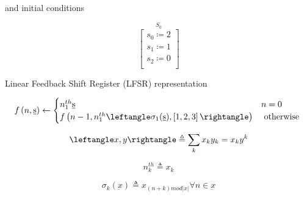 and initial conditions

\begin{equation}
\stackrel{\mbox{$S_0$}}{
\left[ \begin{array}{c}
s_0 \coloneqq 2 \\
s_1 \coloneqq 1 \\
s_2 \coloneqq 0 \\
\end{array} \right]
}
\label{eq:direct_init}
\end{equation}

Linear Feedback Shift Register (LFSR) representation
\newline

\begin{equation}
f\left(n,\underbar{s}\right)
\leftarrow
\begin{cases}
n^{th}_1 \underbar{s} & n = 0 \\
f\left( n-1, n^{th}_1 \leftangle \sigma_{1}(\underbar{s}), \left[ 1,2,3 \right] \rightangle \right) & \mbox{ otherwise }
\end{cases}
\label{eq:lfsr_def}
\end{equation}

\begin{equation}
\leftangle x, y \rightangle
\triangleq
\sum_{k} x_k y_k 
= x_k y^k
\label{eq:dotprod}
\end{equation}

\begin{equation}
n^{th}_k
\triangleq
x_k
\label{eq:nth}
\end{equation}

\begin{equation}
\sigma_k \left( \underbar{x} \right)
\triangleq
x_{\left( n + k \right) mod |x|} \forall n \in \underbar{x}
\label{eq:rotate}
\end{equation}

